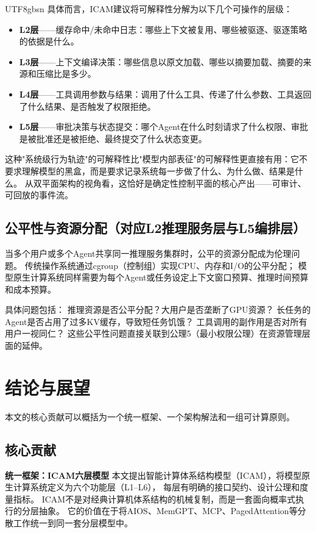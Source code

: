 \documentclass[11pt,a4paper]{article}
\begin{document}
\begin{CJK*}{UTF8}{gbsn}
具体而言，ICAM建议将可解释性分解为以下几个可操作的层级：

\begin{itemize}[nosep]
\item \textbf{L2层}——缓存命中/未命中日志：哪些上下文被复用、哪些被驱逐、驱逐策略的依据是什么。
\item \textbf{L3层}——上下文编译决策：哪些信息以原文加载、哪些以摘要加载、摘要的来源和压缩比是多少。
\item \textbf{L4层}——工具调用参数与结果：调用了什么工具、传递了什么参数、工具返回了什么结果、是否触发了权限拒绝。
\item \textbf{L5层}——审批决策与状态提交：哪个Agent在什么时刻请求了什么权限、审批是被批准还是被拒绝、最终提交了什么状态变更。
\end{itemize}

这种"系统级行为轨迹"的可解释性比"模型内部表征"的可解释性更直接有用：它不要求理解模型的黑盒，而是要求记录系统每一步做了什么、为什么做、结果是什么。
从双平面架构的视角看，这恰好是确定性控制平面的核心产出——可审计、可回放的事件流。

\subsection{公平性与资源分配（对应L2推理服务层与L5编排层）}

当多个用户或多个Agent共享同一推理服务集群时，公平的资源分配成为伦理问题。
传统操作系统通过cgroup（控制组）实现CPU、内存和I/O的公平分配\cite{linux_cgroup_2026}；
模型原生计算系统同样需要为每个Agent或任务设定上下文窗口预算、推理时间预算和成本预算。

具体问题包括：
推理资源是否公平分配？大用户是否垄断了GPU资源？
长任务的Agent是否占用了过多KV缓存，导致短任务饥饿？
工具调用的副作用是否对所有用户一视同仁？
这些公平性问题直接关联到公理5（最小权限公理）在资源管理层面的延伸。

\section{结论与展望}
\label{sec:conclusion}

本文的核心贡献可以概括为一个统一框架、一个架构解法和一组可计算原则。

\subsection{核心贡献}

\textbf{统一框架：ICAM六层模型}
本文提出智能计算体系结构模型（ICAM），将模型原生计算系统定义为六个功能层（L1--L6），
每层有明确的接口契约、设计公理和度量指标。
ICAM不是对经典计算机体系结构的机械复制，而是一套面向概率式执行的分层抽象。
它的价值在于将AIOS\cite{mei2024aios}、MemGPT\cite{memgpt2023}、MCP\cite{mcp_intro_2026}、PagedAttention\cite{kwon2023pagedattention}等分散工作统一到同一套分层模型中。


\end{CJK*}
\end{document}
